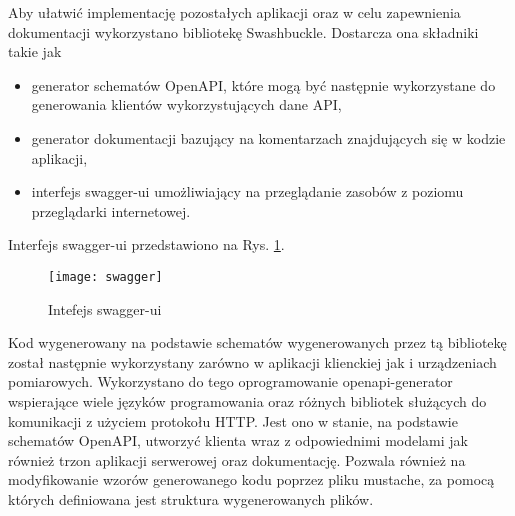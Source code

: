 Aby ułatwić implementację pozostałych aplikacji oraz w celu zapewnienia dokumentacji
wykorzystano bibliotekę Swashbuckle. Dostarcza ona składniki takie jak 
\begin{itemize}
  \item generator schematów OpenAPI, które mogą być następnie wykorzystane do generowania klientów
wykorzystujących dane API,
  \item generator dokumentacji bazujący na komentarzach znajdujących się w kodzie aplikacji,
  \item interfejs swagger-ui umożliwiający na przeglądanie zasobów z poziomu przeglądarki internetowej.
\end{itemize}
Interfejs swagger-ui przedstawiono na Rys. \ref{swagger:interface}.
\begin{figure}[h!]
  \centering
  \texttt{[image: swagger]}
  \caption{Intefejs swagger-ui}
  \label{swagger:interface}
\end{figure}
Kod wygenerowany na podstawie schematów wygenerowanych przez tą bibliotekę został następnie
wykorzystany zarówno w aplikacji klienckiej jak i urządzeniach pomiarowych.
Wykorzystano do tego oprogramowanie openapi-generator wspierające wiele języków
programowania oraz różnych bibliotek służących do komunikacji z użyciem protokołu HTTP.
Jest ono w stanie, na podstawie schematów OpenAPI, utworzyć klienta wraz z odpowiednimi
modelami jak również trzon aplikacji serwerowej oraz dokumentację. Pozwala również
na modyfikowanie wzorów generowanego kodu poprzez pliku mustache, za pomocą których
definiowana jest struktura wygenerowanych plików.

